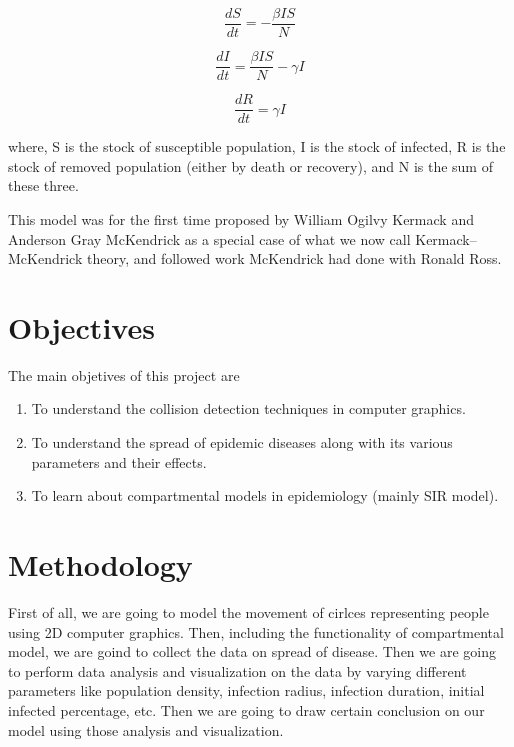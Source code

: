 \documentclass[a4paper, 12pt]{article}
\begin{document}
\begin{equation}
\frac{dS}{dt} = -\frac{\beta IS}{N}
\end{equation}

\begin{equation}
\frac{dI}{dt} = \frac{\beta IS}{N} - \gamma I
\end{equation}

\begin{equation}
\frac{dR}{dt} = \gamma I
\end{equation}
 
 where, S is the stock of susceptible population, I is the stock of infected, R is the stock of removed population (either by death or recovery), and N is the sum of these three.
 
This model was for the first time proposed by William Ogilvy Kermack and Anderson Gray McKendrick as a special case of what we now call Kermack–McKendrick theory, and followed work McKendrick had done with Ronald Ross.

\clearpage

\section{Objectives}
The main objetives of this project are

\begin{enumerate}
  \item To understand the collision detection techniques in computer graphics.
  \item To understand the spread of epidemic diseases along with its various parameters and their effects.
  \item To learn about compartmental models in epidemiology (mainly SIR model).
\end{enumerate}

\section{Methodology}
First of all, we are going to model the movement of cirlces representing people using 2D computer graphics. Then, including the functionality of compartmental model, we are goind to collect the data on spread of disease. Then we are going to perform data analysis and visualization on the data by varying different parameters like population density, infection radius, infection duration, initial infected percentage, etc. Then we are going to draw certain conclusion on our model using those analysis and visualization.
\end{document}
